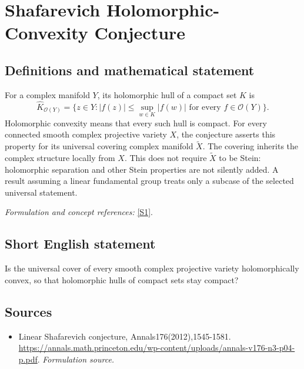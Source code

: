 \documentclass[11pt]{article}
\begin{document}
\section*{\texorpdfstring{Shafarevich Holomorphic-Convexity Conjecture}{Shafarevich Holomorphic-Convexity Conjecture}}\label{254}
\subsection{Definitions and mathematical statement}
For a complex manifold $Y$, its holomorphic hull of a compact set $K$ is
\[
 \widehat K_{\mathcal O(Y)}=
 \{z\in Y:|f(z)|\le\sup_{w\in K}|f(w)|\text{ for every }f\in\mathcal O(Y)\}.
\]
Holomorphic convexity means that every such hull is compact. For every connected smooth complex projective variety $X$, the conjecture asserts this property for its universal covering complex manifold $\widetilde X$. The covering inherits the complex structure locally from $X$. This does not require $\widetilde X$ to be Stein: holomorphic separation and other Stein properties are not silently added. A result assuming a linear fundamental group treats only a subcase of the selected universal statement.
\par\smallskip\textit{Formulation and concept references:} \href{https://annals.math.princeton.edu/wp-content/uploads/annals-v176-n3-p04-p.pdf}{[S1]}.

\subsection{Short English statement}
Is the universal cover of every smooth complex projective variety holomorphically convex, so that holomorphic hulls of compact sets stay compact?
\subsection{Sources}
\begin{itemize}
\item[S1]Linear Shafarevich conjecture, Annals176(2012),1545-1581.
\url{https://annals.math.princeton.edu/wp-content/uploads/annals-v176-n3-p04-p.pdf}.
\textit{Formulation source.}
\end{itemize}
\end{document}
